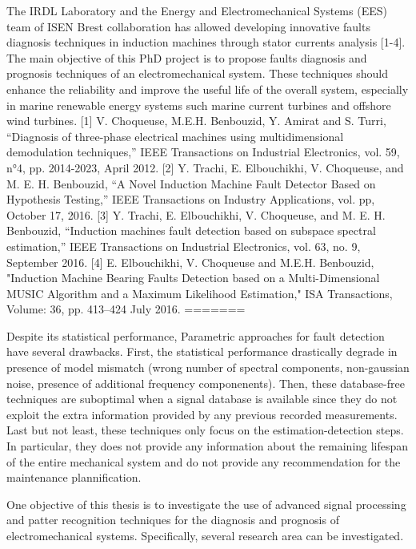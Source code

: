 \documentclass{article}
\begin{document}
The IRDL Laboratory and the Energy and Electromechanical Systems (EES) team of ISEN Brest collaboration has allowed developing innovative faults diagnosis techniques in induction machines through stator currents analysis [1-4].  The main objective of this PhD project is to propose faults diagnosis and prognosis techniques of an electromechanical system. These techniques should enhance the reliability and improve the useful life of the overall system, especially in marine renewable energy systems such marine current turbines and offshore wind turbines.
[1]	V. Choqueuse, M.E.H. Benbouzid, Y. Amirat and S. Turri, “Diagnosis of three-phase electrical machines using multidimensional demodulation techniques,” IEEE Transactions on Industrial Electronics, vol. 59, n°4, pp. 2014-2023, April 2012.
[2]	Y. Trachi, E. Elbouchikhi, V. Choqueuse, and M. E. H. Benbouzid, “A Novel Induction Machine Fault Detector Based on Hypothesis Testing,” IEEE Transactions on Industry Applications, vol. pp, October 17, 2016. 
[3]	Y. Trachi, E. Elbouchikhi, V. Choqueuse, and M. E. H. Benbouzid, “Induction machines fault detection based on subspace spectral estimation,” IEEE Transactions on Industrial Electronics, vol. 63, no. 9, September 2016. 
[4]	E. Elbouchikhi, V. Choqueuse and M.E.H. Benbouzid, "Induction Machine Bearing Faults Detection based on a Multi-Dimensional MUSIC Algorithm and a Maximum Likelihood Estimation," ISA Transactions, Volume: 36, pp. 413–424 July 2016. 
=======


Despite its statistical performance, Parametric approaches for fault detection have several drawbacks. First, the statistical performance drastically degrade in presence of model mismatch (wrong number of spectral components, non-gaussian noise, presence of additional frequency componenents). Then, these database-free techniques are suboptimal when a signal database is available since they do not exploit the extra information provided by any previous recorded measurements.
Last but not least, these techniques only focus on the estimation-detection steps. In particular, they does not provide any information about the remaining lifespan of the entire mechanical system and do not provide any recommendation for the maintenance plannification.

One objective of this thesis is to investigate the use of advanced signal processing and patter recognition techniques for the diagnosis and prognosis of electromechanical systems. Specifically, several research area can be investigated.
\end{document}
